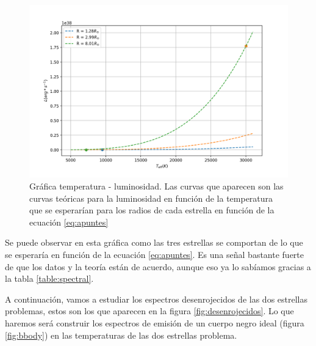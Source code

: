 \documentclass{aa} %
\begin{document}
\begin{figure}[h!]
\begin{center}
\includegraphics[scale=0.35]{TL.png}
\caption{Gráfica temperatura - luminosidad. Las curvas que aparecen son las curvas teóricas para la luminosidad en función de la temperatura que se esperarían para los radios de cada estrella en función de la ecuación \ref{eq:apuntes}}
\label{fig:TL}
\end{center}
\end{figure}

Se puede observar en esta gráfica como las tres estrellas se comportan de lo que se esperaría en función de la ecuación \ref{eq:apuntes}. Es una señal bastante fuerte de que los datos y la teoría están de acuerdo, aunque eso ya lo sabíamos gracias a la tabla \ref{table:spectral}.

A continuación, vamos a estudiar los espectros desenrojecidos de las dos estrellas problemas, estos son los que aparecen en la figura \ref{fig:desenrojecidos}. Lo que haremos será construir los espectros de emisión de un cuerpo negro ideal (figura \ref{fig:bbody}) en las temperaturas de las dos estrellas problema.
\end{document}
